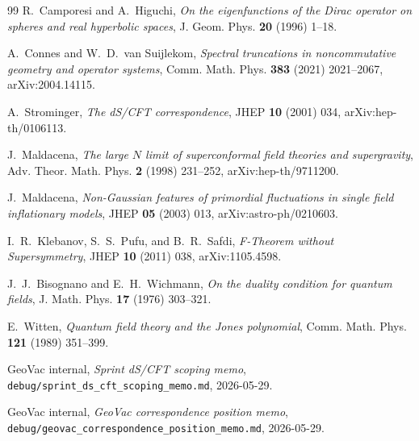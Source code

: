 \documentclass[11pt,a4paper]{article}
\theoremstyle{plain}
\theoremstyle{definition}
\begin{document}
\begin{thebibliography}{99}
 R.~Camporesi and A.~Higuchi,
\emph{On the eigenfunctions of the Dirac operator on spheres and real
hyperbolic spaces},
J. Geom. Phys. \textbf{20} (1996) 1--18.

 A.~Connes and W.~D.~van Suijlekom,
\emph{Spectral truncations in noncommutative geometry and operator systems},
Comm. Math. Phys. \textbf{383} (2021) 2021--2067, arXiv:2004.14115.

 A.~Strominger,
\emph{The dS/CFT correspondence},
JHEP \textbf{10} (2001) 034, arXiv:hep-th/0106113.

 J.~Maldacena,
\emph{The large $N$ limit of superconformal field theories and supergravity},
Adv. Theor. Math. Phys. \textbf{2} (1998) 231--252, arXiv:hep-th/9711200.

 J.~Maldacena,
\emph{Non-Gaussian features of primordial fluctuations in single field inflationary models},
JHEP \textbf{05} (2003) 013, arXiv:astro-ph/0210603.

 I.~R.~Klebanov, S.~S.~Pufu, and B.~R.~Safdi,
\emph{F-Theorem without Supersymmetry},
JHEP \textbf{10} (2011) 038, arXiv:1105.4598.

 J.~J.~Bisognano and E.~H.~Wichmann,
\emph{On the duality condition for quantum fields},
J. Math. Phys. \textbf{17} (1976) 303--321.

 E.~Witten,
\emph{Quantum field theory and the Jones polynomial},
Comm. Math. Phys. \textbf{121} (1989) 351--399.

 GeoVac internal,
\emph{Sprint dS/CFT scoping memo},
\texttt{debug/sprint\_ds\_cft\_scoping\_memo.md}, 2026-05-29.

 GeoVac internal,
\emph{GeoVac correspondence position memo},
\texttt{debug/geovac\_correspondence\_position\_memo.md}, 2026-05-29.

\end{thebibliography}
\end{document}
